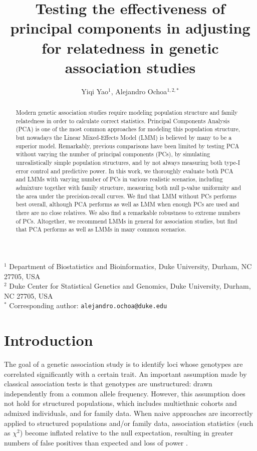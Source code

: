 \documentclass[11pt]{article}
\title{\Large \textbf{Testing the effectiveness of principal components in adjusting for relatedness in genetic association studies}}
\author{Yiqi Yao$^1$, Alejandro Ochoa$^{1,2,*}$}
\date{}
\begin{document}
\maketitle

\noindent
$^1$ Department of Biostatistics and Bioinformatics, Duke University, Durham, NC 27705, USA \\
$^2$ Duke Center for Statistical Genetics and Genomics, Duke University, Durham, NC 27705, USA \\
$^*$ Corresponding author: \texttt{alejandro.ochoa@duke.edu}


\begin{abstract}
  Modern genetic association studies require modeling population structure and family relatedness in order to calculate correct statistics.
  Principal Components Analysis (PCA) is one of the most common approaches for modeling this population structure, but nowadays the Linear Mixed-Effects Model (LMM) is believed by many to be a superior model.
  Remarkably, previous comparisons have been limited by testing PCA without varying the number of principal components (PCs), by simulating unrealistically simple population structures, and by not always measuring both type-I error control and predictive power.
  In this work, we thoroughly evaluate both PCA and LMMs with varying number of PCs in various realistic scenarios, including admixture together with family structure, measuring both null p-value uniformity and the area under the precision-recall curves.
  We find that LMM without PCs performs best overall, although PCA performs as well as LMM when enough PCs are used and there are no close relatives.
  We also find a remarkable robustness to extreme numbers of PCs.
  Altogether, we recommend LMMs in general for association studies, but find that PCA performs as well as LMMs in many common scenarios.
\end{abstract}



\clearpage
	
\section{Introduction} 

The goal of a genetic association study is to identify loci whose genotypes are correlated significantly with a certain trait.
An important assumption made by classical association tests is that genotypes are unstructured: drawn independently from a common allele frequency.
However, this assumption does not hold for structured populations, which includes multiethnic cohorts and admixed individuals, and for family data.
When naive approaches are incorrectly applied to structured populations and/or family data, association statistics (such as $\chi^2$) become inflated relative to the null expectation, resulting in greater numbers of false positives than expected and loss of power \citep{devlin_genomic_1999, voight_confounding_2005, astle_population_2009}.
\end{document}

